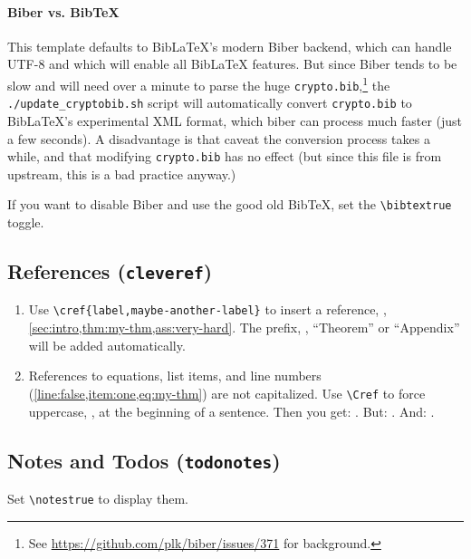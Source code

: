 \paragraph{Biber vs. BibTeX}\label{sec:biber}
This template defaults to BibLaTeX's modern Biber backend, which can handle UTF-8 and which will enable all BibLaTeX features.
But since Biber tends to be slow and will need over a minute to parse the huge \texttt{crypto.bib},\footnote{See \url{https://github.com/plk/biber/issues/371} for background.}
the \verb|./update_cryptobib.sh| script will automatically convert \texttt{crypto.bib} to BibLaTeX's experimental XML format,
which biber can process much faster (just a few seconds).
A disadvantage is that caveat the conversion process takes a while, and that modifying \texttt{crypto.bib} has no effect (but since this file is from upstream, this is a bad practice anyway.)

If you want to disable Biber and use the good old BibTeX, set the \verb|\bibtextrue| toggle.


\subsection{References (\texttt{cleveref})}
\begin{enumerate}
  \item\label{item:one}
        Use \verb|\cref{label,maybe-another-label}| to insert a reference, \eg, \cref{sec:intro,thm:my-thm,ass:very-hard}.
        The prefix, \eg, ``Theorem'' or ``Appendix'' will be added automatically.
  \item
        References to equations, list items, and line numbers (\cref{line:false,item:one,eq:my-thm}) are not capitalized.
        Use \verb|\Cref| to force uppercase, \eg, at the beginning of a sentence.
        Then you get:
        . But: . And: .
\end{enumerate}


\subsection{Notes and Todos (\texttt{todonotes})}
Set \verb|\notestrue| to display them.



